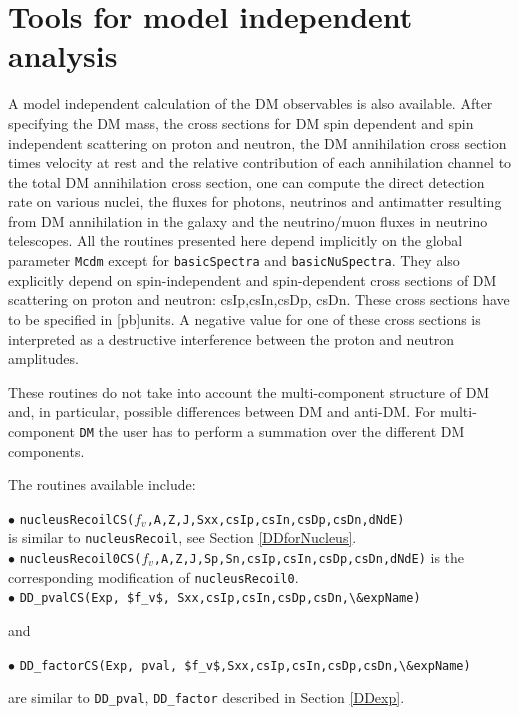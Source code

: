 \documentclass[12pt,a4paper]{article}
\begin{document}
\section{Tools for model independent analysis}
\label{mdlIndep}

A model independent calculation of the DM observables is also available.
After specifying the DM mass, the cross sections for DM  spin dependent and  spin independent scattering on proton and neutron, the DM annihilation cross section times velocity at rest and the relative contribution of  each annihilation channel to the total DM annihilation cross section, one can compute the direct detection rate on   various nuclei, the fluxes for photons, neutrinos and antimatter resulting from DM annihilation in the galaxy and the neutrino/muon fluxes in neutrino telescopes.  
All the routines presented here 
depend implicitly on the  global parameter {\tt Mcdm} except for {\tt basicSpectra} and {\tt basicNuSpectra}.
They also explicitly depend on spin-independent and spin-dependent cross sections of DM scattering
on proton and neutron: csIp,csIn,csDp, csDn. These cross sections have to be specified in
[pb]units. A negative value for one of these cross sections is interpreted as a destructive 
interference between the proton and neutron amplitudes. 

These routines do not   take into account the multi-component structure of DM and, in particular, possible   
differences between DM and anti-DM.    For multi-component {\tt DM} the user has to perform a summation over the different DM components. 

The routines available include:
   
\noindent
$\bullet$ \verb|nucleusRecoilCS(|$f_v$\verb|,A,Z,J,Sxx,csIp,csIn,csDp,csDn,dNdE)|\\
is similar to \verb|nucleusRecoil|, see Section \ref{DDforNucleus}.  \\
\noindent
$\bullet$ \verb|nucleusRecoil0CS(|$f_v$\verb|,A,Z,J,Sp,Sn,csIp,csIn,csDp,csDn,dNdE)|
is the corresponding modification of \verb|nucleusRecoil0|.\\

\noindent
$\bullet$ \verb|DD_pvalCS(Exp, $f_v$, Sxx,csIp,csIn,csDp,csDn,\&expName)|

\noindent
and

\noindent
$\bullet$ \verb|DD_factorCS(Exp, pval, $f_v$,Sxx,csIp,csIn,csDp,csDn,\&expName)|

\noindent
are similar to  \verb|DD_pval|, \verb|DD_factor| described in Section \ref{DDexp}.
\end{document}
